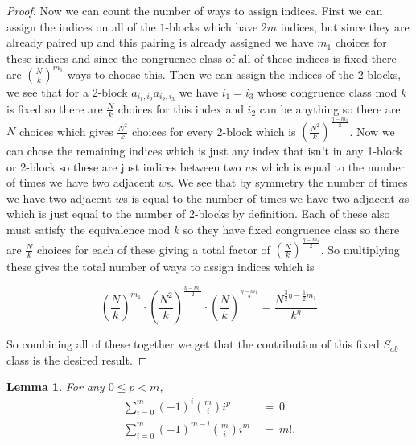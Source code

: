 \documentclass[12pt,reqno]{amsart}
\theoremstyle{plain} %
\newtheorem{lemma}[theorem]{Lemma}
\theoremstyle{remark}
\theoremstyle{definition}
\newcommand{\R}{\mathbb R}
\renewcommand{\a}{\alpha}
\begin{document}
\begin{proof}
Now we can count the number of ways to assign indices. First we can assign the indices on all of the $1$-blocks which have $2m$ indices, but since they are already paired up and this pairing is already assigned we have $m_1$ choices for these indices and since the congruence class of all of these indices is fixed there are $(\frac{N}{k})^{m_1}$ ways to choose this. Then we can assign the indices of the 2-blocks, we see that for a 2-block $a_{i_1,i_2}a_{i_2,i_3}$ we have $i_1=i_3$ whose congruence class mod $k$ is fixed so there are $\frac{N}{k}$ choices for this index and $i_2$ can be anything so there are $N$ choices which gives $\frac{N^2}{k}$ choices for every 2-block which is $(\frac{N^2}{k})^{\frac{\eta-m_1}{2}}$. Now we can chose the remaining indices which is just any index that isn't in any 1-block or 2-block so these are just indices between two $w$s which is equal to the number of times we have two adjacent $w$s. We see that by symmetry the number of times we have two adjacent $w$s is equal to the number of times we have two adjacent $a$s which is just equal to the number of 2-blocks by definition. Each of these also must satisfy the equivalence mod $k$ so they have fixed congruence class so there are $\frac{N}{k}$ choices for each of these giving a total factor of $(\frac{N}{k})^{\frac{\eta-m_1}{2}}$. So multiplying these gives the total number of ways to assign indices which is

\[
\left(\frac{N}{k}\right)^{m_1}\cdot \left(\frac{N^2}{k}\right)^{\frac{\eta-m_1}{2}}\cdot \left(\frac{N}{k}\right)^{\frac{\eta-m_1}{2}}=\frac{N^{\frac{3}{2}\eta-\frac{1}{2}m_1}}{k^\eta}
\]

So combining all of these together we get that the contribution of this fixed $S_{ab}$ class is the desired result.
\end{proof}


\begin{lemma}\label{inequalities}
For any $0\leq p<m$,
\begin{align*}
\sum_{i=0}^m(-1)^i\binom{m}{i}i^p &\ = \ 0. \\
\sum_{i=0}^m(-1)^{m-i}\binom{m}{i}i^m &\ = \ m!.
\end{align*}
\end{lemma}
\end{document}
